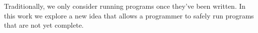 Traditionally, we only consider running programs once they've been
written. In this work we explore a new idea that allows a programmer to
safely run programs that are not yet complete.
